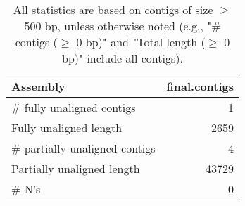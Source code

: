 \documentclass[12pt,a4paper]{article}
\begin{document}
\begin{table}[ht]
\begin{center}
\caption{All statistics are based on contigs of size $\geq$ 500 bp, unless otherwise noted (e.g., "\# contigs ($\geq$ 0 bp)" and "Total length ($\geq$ 0 bp)" include all contigs).}
\begin{tabular}{|l*{1}{|r}|}
\hline
Assembly & final.contigs \\ \hline
\# fully unaligned contigs & 1 \\ \hline
Fully unaligned length & 2659 \\ \hline
\# partially unaligned contigs & 4 \\ \hline
Partially unaligned length & 43729 \\ \hline
\# N's & 0 \\ \hline
\end{tabular}
\end{center}
\end{table}
\end{document}

